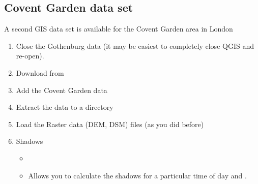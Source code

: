 \documentclass[letterpaper,10pt,english]{sphinxmanual}
\begin{document}
\subsection{Covent Garden data set}
\label{\detokenize{Tutorials/SEBE:covent-garden-data-set}}
A second GIS data set is available for the Covent Garden area in London
\begin{enumerate}
\item {} 
Close the Gothenburg data (it may be easiest to completely close QGIS
and re-open).

\item {} 
Download from

\item {} 
Add the Covent Garden data

\item {} 
Extract the data to a directory

\item {} 
Load the Raster data (DEM, DSM) files (as you did before)

\item {} 
Shadows
\begin{itemize}
\item {} 
{\hyperref[\detokenize{processor/Solar Radiation Daily Shadow Pattern:dailyshadowpattern}]{}}

\item {} 
Allows you to calculate the shadows for a particular time of day
and .

\end{itemize}

\end{enumerate}
\end{document}
